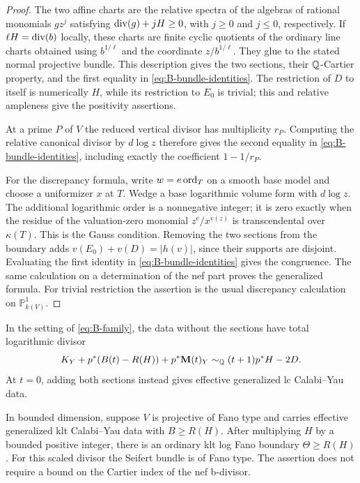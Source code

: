 \begin{proof}
The two affine charts are the relative spectra of the algebras of
rational monomials $gz^j$ satisfying
$\operatorname{div}(g)+jH\ge0$, with $j\ge0$ and $j\le0$, respectively.
If $\ell H=\operatorname{div}(b)$ locally, these charts are finite cyclic
quotients of the ordinary line charts obtained using $b^{1/\ell}$
and the coordinate $z/b^{1/\ell}$.  They glue to the stated normal
projective bundle.  This description gives the two sections, their
$\mathbb Q$-Cartier property, and the first equality in
\eqref{eq:B-bundle-identities}.  The restriction of $D$ to itself is
numerically $H$, while its restriction to $E_0$ is trivial; this and
relative ampleness give the positivity assertions.

At a prime $P$ of $V$ the reduced vertical divisor has multiplicity
$r_P$.  Computing the relative canonical divisor by $d\log z$
therefore gives the second equality in
\eqref{eq:B-bundle-identities}, including exactly the coefficient
$1-1/r_P$.

For the discrepancy formula, write $w=e\operatorname{ord}_T$ on a smooth base
model and choose a uniformizer $x$ at $T$.  Wedge a base logarithmic
volume form with $d\log z$.  The additional logarithmic order is a
nonnegative integer; it is zero exactly when the residue of the
valuation-zero monomial $z^e/x^{v(z)}$ is transcendental over
$\kappa(T)$.  This is the Gauss condition.  Removing the two
sections from the boundary adds $v(E_0)+v(D)=|h(v)|$, since their
supports are disjoint.  Evaluating the first identity in
\eqref{eq:B-bundle-identities} gives the congruence.  The same
calculation on a determination of the nef part proves the generalized
formula.  For trivial restriction the assertion is the usual
discrepancy calculation on $\mathbb P^1_{k(V)}$.
\end{proof}

In the setting of \eqref{eq:B-family}, the data without the sections
have total logarithmic divisor
\begin{equation}\label{eq:B-bundle-total}
 K_Y+p^*(B(t)-R(H))+p^*\mathbf M(t)_Y
 \sim_{\mathbb Q}(t+1)p^*H-2D.
\end{equation}
At $t=0$, adding both sections instead gives effective generalized
lc Calabi--Yau data.

\begin{lemma}\label{lem:B-denominator-clearing}
In bounded dimension, suppose $V$ is projective of Fano type and
carries effective generalized klt Calabi--Yau data with
$B\ge R(H)$.  After multiplying $H$ by a bounded positive integer,
there is an ordinary klt log Fano boundary $\Theta\ge R(H)$.
For this scaled divisor the Seifert bundle is of Fano type.
The assertion does not require a bound on the Cartier index of the
nef b-divisor.
\end{lemma}

